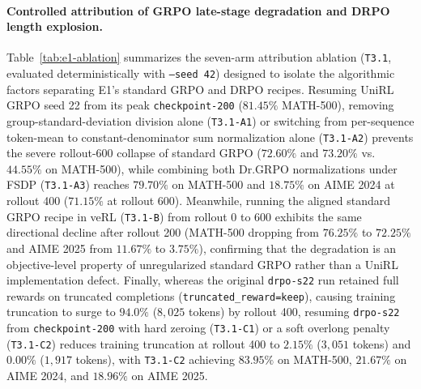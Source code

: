 \documentclass[10pt]{article}
\begin{document}
\paragraph{Controlled attribution of GRPO late-stage degradation and DRPO length explosion.}
Table~\ref{tab:e1-ablation} summarizes the seven-arm attribution ablation (\texttt{T3.1}, evaluated deterministically with \texttt{--seed 42}) designed to isolate the algorithmic factors separating E1's standard GRPO and DRPO recipes.
Resuming UniRL GRPO seed 22 from its peak \texttt{checkpoint-200} ($81.45\%$ MATH-500), removing group-standard-deviation division alone (\texttt{T3.1-A1}) or switching from per-sequence token-mean to constant-denominator sum normalization alone (\texttt{T3.1-A2}) prevents the severe rollout-600 collapse of standard GRPO ($72.60\%$ and $73.20\%$ vs.\ $44.55\%$ on MATH-500), while combining both Dr.GRPO normalizations under FSDP (\texttt{T3.1-A3}) reaches $79.70\%$ on MATH-500 and $18.75\%$ on AIME 2024 at rollout 400 ($71.15\%$ at rollout 600).
Meanwhile, running the aligned standard GRPO recipe in veRL (\texttt{T3.1-B}) from rollout 0 to 600 exhibits the same directional decline after rollout 200 (MATH-500 dropping from $76.25\%$ to $72.25\%$ and AIME 2025 from $11.67\%$ to $3.75\%$), confirming that the degradation is an objective-level property of unregularized standard GRPO rather than a UniRL implementation defect.
Finally, whereas the original \texttt{drpo-s22} run retained full rewards on truncated completions (\texttt{truncated\_reward=keep}), causing training truncation to surge to $94.0\%$ ($8{,}025$ tokens) by rollout 400, resuming \texttt{drpo-s22} from \texttt{checkpoint-200} with hard zeroing (\texttt{T3.1-C1}) or a soft overlong penalty (\texttt{T3.1-C2}) reduces training truncation at rollout 400 to $2.15\%$ ($3{,}051$ tokens) and $0.00\%$ ($1{,}917$ tokens), with \texttt{T3.1-C2} achieving $83.95\%$ on MATH-500, $21.67\%$ on AIME 2024, and $18.96\%$ on AIME 2025.
\end{document}
